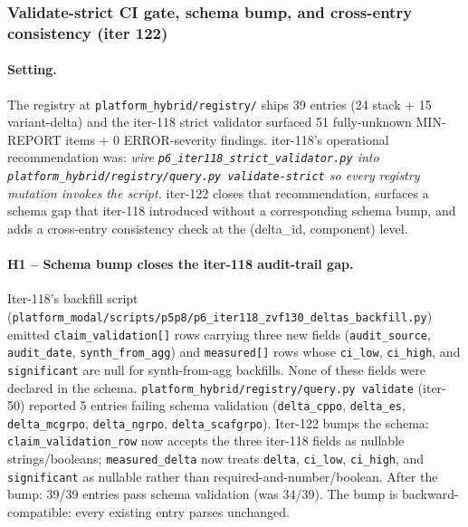 
\subsubsection{Validate-strict CI gate, schema bump, and cross-entry consistency (iter 122)}
\label{sec:p6-iter122-validate-strict}

\paragraph{Setting.}
The registry at \texttt{platform_hybrid/registry/} ships 39 entries (24 stack + 15
variant-delta) and the iter-118 strict validator surfaced 51 fully-unknown
MIN-REPORT items + 0 ERROR-severity findings. iter-118's operational
recommendation was: \emph{wire \texttt{p6\_iter118\_strict\_validator.py}
into \texttt{platform_hybrid/registry/query.py validate-strict} so every registry mutation
invokes the script.} iter-122 closes that recommendation, surfaces a
schema gap that iter-118 introduced without a corresponding schema bump,
and adds a cross-entry consistency check at the (delta\_id, component)
level.

\paragraph{H1 -- Schema bump closes the iter-118 audit-trail gap.}
Iter-118's backfill script
(\texttt{platform_modal/scripts/p5p8/p6\_iter118\_zvf130\_deltas\_backfill.py}) emitted
\texttt{claim\_validation[]} rows carrying three new fields
(\texttt{audit\_source}, \texttt{audit\_date}, \texttt{synth\_from\_agg})
and \texttt{measured[]} rows whose \texttt{ci\_low}, \texttt{ci\_high},
and \texttt{significant} are null for synth-from-agg backfills. None of
these fields were declared in the schema. \texttt{platform_hybrid/registry/query.py
validate} (iter-50) reported 5 entries failing schema validation
(\texttt{delta\_cppo}, \texttt{delta\_es}, \texttt{delta\_mcgrpo},
\texttt{delta\_ngrpo}, \texttt{delta\_scafgrpo}). Iter-122 bumps the
schema: \texttt{claim\_validation\_row} now accepts the three iter-118
fields as nullable strings/booleans; \texttt{measured\_delta} now treats
\texttt{delta}, \texttt{ci\_low}, \texttt{ci\_high}, and
\texttt{significant} as nullable rather than required-and-number/boolean.
After the bump: 39/39 entries pass schema validation (was 34/39). The
bump is backward-compatible: every existing entry parses unchanged.

